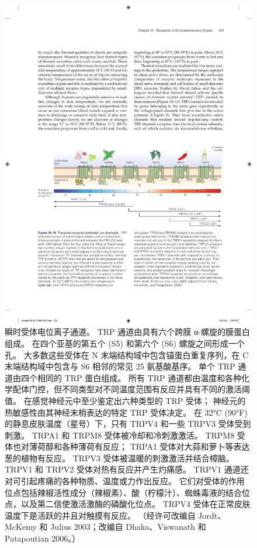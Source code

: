 \begin{figure}[htbp]
	\centering
	\includegraphics[width=1.0\linewidth]{chap18/fig_18_10}
	\caption{瞬时受体电位离子通道。 
		TRP 通道由具有六个跨膜 α-螺旋的膜蛋白组成。 
		在四个亚基的第五个 (S5) 和第六个 (S6) 螺旋之间形成一个孔。 
		大多数这些受体在 N 末端结构域中包含锚蛋白重复序列，在 C 末端结构域中包含与 S6 相邻的常见 25 氨基酸基序。 
		单个 TRP 通道由四个相同的 TRP 蛋白组成。 
		所有 TRP 通道都由温度和各种化学配体门控，但不同类型对不同温度范围有反应并具有不同的激活阈值。 
		在感觉神经元中至少鉴定出六种类型的 TRP 受体； 神经元的热敏感性由其神经末梢表达的特定 TRP 受体决定。 
		在 32°C (90°F) 的静息皮肤温度（星号）下，只有 TRPV4 和一些 TRPV3 受体受到刺激。 
		TRPA1 和 TRPM8 受体被冷却和冷刺激激活。 
		TRPM8 受体也对薄荷醇和各种薄荷有反应； TRPA1 受体对大蒜和萝卜等表达葱的植物有反应。 
		TRPV3 受体被温暖的刺激激活并结合樟脑。 
		TRPV1 和 TRPV2 受体对热有反应并产生灼痛感。 
		TRPV1 通道还对可引起疼痛的各种物质、温度或力作出反应。 
		它们对受体的作用位点包括辣椒活性成分（辣椒素）、酸（柠檬汁）、蜘蛛毒液的结合位点，以及第二信使激活激酶的磷酸化位点。 
		TRPV4 受体在正常皮肤温度下是活跃的并且对触摸有反应。 （经许可改编自 Jordt、McKemy 和 Julius 2003；改编自 Dhaka、Viswanath 和 Patapoutian 2006。）}
	\label{fig:18_10}
\end{figure}


